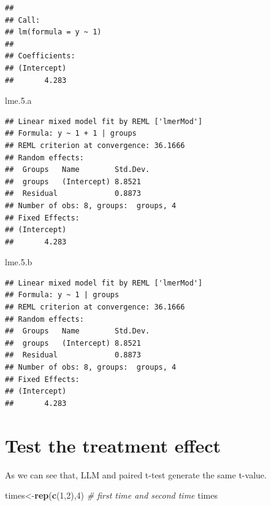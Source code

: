 \documentclass[]{book}
\newenvironment{Shaded}{\begin{snugshade}}{\end{snugshade}}
\newcommand{\KeywordTok}[1]{\textcolor[rgb]{0.13,0.29,0.53}{\textbf{#1}}}
\newcommand{\DecValTok}[1]{\textcolor[rgb]{0.00,0.00,0.81}{#1}}
\newcommand{\FloatTok}[1]{\textcolor[rgb]{0.00,0.00,0.81}{#1}}
\newcommand{\CommentTok}[1]{\textcolor[rgb]{0.56,0.35,0.01}{\textit{#1}}}
\newcommand{\NormalTok}[1]{#1}
\begin{document}
\begin{verbatim}
## 
## Call:
## lm(formula = y ~ 1)
## 
## Coefficients:
## (Intercept)  
##       4.283
\end{verbatim}

\begin{Shaded}
\begin{Highlighting}[]
\NormalTok{lme.}\FloatTok{5.}\NormalTok{a }
\end{Highlighting}
\end{Shaded}

\begin{verbatim}
## Linear mixed model fit by REML ['lmerMod']
## Formula: y ~ 1 + 1 | groups
## REML criterion at convergence: 36.1666
## Random effects:
##  Groups   Name        Std.Dev.
##  groups   (Intercept) 8.8521  
##  Residual             0.8873  
## Number of obs: 8, groups:  groups, 4
## Fixed Effects:
## (Intercept)  
##       4.283
\end{verbatim}

\begin{Shaded}
\begin{Highlighting}[]
\NormalTok{lme.}\FloatTok{5.}\NormalTok{b }
\end{Highlighting}
\end{Shaded}

\begin{verbatim}
## Linear mixed model fit by REML ['lmerMod']
## Formula: y ~ 1 | groups
## REML criterion at convergence: 36.1666
## Random effects:
##  Groups   Name        Std.Dev.
##  groups   (Intercept) 8.8521  
##  Residual             0.8873  
## Number of obs: 8, groups:  groups, 4
## Fixed Effects:
## (Intercept)  
##       4.283
\end{verbatim}

\section{Test the treatment effect}\label{test-the-treatment-effect}

As we can see that, LLM and paired t-test generate the same t-value.

\begin{Shaded}
\begin{Highlighting}[]
\NormalTok{times<-}\KeywordTok{rep}\NormalTok{(}\KeywordTok{c}\NormalTok{(}\DecValTok{1}\NormalTok{,}\DecValTok{2}\NormalTok{),}\DecValTok{4}\NormalTok{) }\CommentTok{# first time and second time}
\NormalTok{times}
\end{Highlighting}
\end{Shaded}
\end{document}
